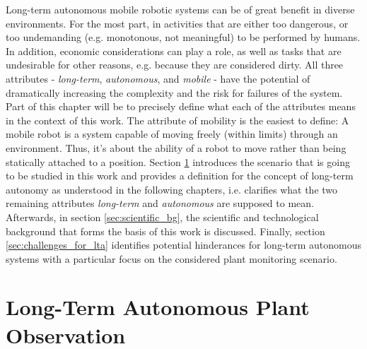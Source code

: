 \documentclass[english, master, utf8]{base/thesis_KBS}
\begin{document}
Long-term autonomous mobile robotic systems can be of great benefit in diverse environments. For the most part, in activities that are either too dangerous,
or too undemanding (e.g. monotonous, not meaningful) to be performed by humans. In addition, economic considerations can play a role, as well as tasks 
that are undesirable for other reasons, e.g. because they are considered dirty.
All three attributes - \textit{long-term}, \textit{autonomous}, and \textit{mobile} - have the potential of dramatically increasing the complexity and
the risk for failures of the system. Part of this chapter will be to precisely define what each of the attributes means in the context of this work.
The attribute of mobility is the easiest to define: A mobile robot is a system capable of moving freely (within limits) through an environment. \cite{Hertzberg:2012}
Thus, it's about the ability of a robot to move rather than being statically attached to a position.
Section \ref{sec:lta_plant_observation} introduces the scenario that is going to be studied in this work and provides a definition for the concept of long-term 
autonomy as understood in the following chapters, i.e. clarifies what the two remaining attributes \textit{long-term} and \textit{autonomous} are supposed to mean.
Afterwards, in section \ref{sec:scientific_bg}, the scientific and technological background that forms the basis of this work is discussed. 
Finally, section \ref{sec:challenges_for_lta} identifies potential hinderances for long-term autonomous systems with a particular focus on the considered plant monitoring scenario.

\section{Long-Term Autonomous Plant Observation}
\label{sec:lta_plant_observation}
\end{document}
